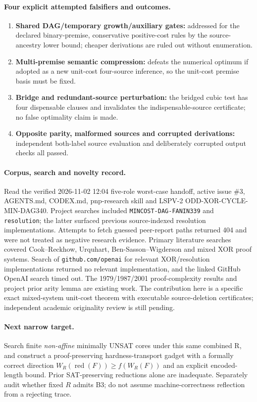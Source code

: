 \documentclass[11pt]{article}
\begin{document}
\paragraph{Four explicit attempted falsifiers and outcomes.}
\begin{enumerate}
\item[] \textbf{Shared DAG/temporary growth/auxiliary gates:} addressed for the declared binary-premise, conservative positive-cost rules by the source-ancestry lower bound; cheaper derivations are ruled out without enumeration.
\item[] \textbf{Multi-premise semantic compression:} defeats the numerical optimum if adopted as a new unit-cost four-source inference, so the unit-cost premise basis must be fixed.
\item[] \textbf{Bridge and redundant-source perturbation:} the bridged cubic test has four dispensable clauses and invalidates the indispensable-source certificate; no false optimality claim is made.
\item[] \textbf{Opposite parity, malformed sources and corrupted derivations:} independent both-label source evaluation and deliberately corrupted output checks all passed.
\end{enumerate}

\paragraph{Corpus, search and novelty record.} Read the verified 2026-11-02 12:04 five-role worst-case handoff, active issue \#3, AGENTS.md, CODEX.md, pnp-research skill and LSPV-2 ODD-XOR-CYCLE-MIN-DAG340. Project searches included \texttt{MINCOST-DAG-FANIN339} and \texttt{resolution}; the latter surfaced previous source-indexed resolution implementations. Attempts to fetch guessed peer-report paths returned 404 and were not treated as negative research evidence. Primary literature searches covered Cook--Reckhow, Urquhart, Ben-Sasson--Wigderson and mixed XOR proof systems. Search of \texttt{github.com/openai} for relevant XOR/resolution implementations returned no relevant implementation, and the linked GitHub OpenAI search timed out. The 1979/1987/2001 proof-complexity results and project prior arity lemma are existing work. The contribution here is a specific exact mixed-system unit-cost theorem with executable source-deletion certificates; independent academic originality review is still pending.

\paragraph{Next narrow target.}
Search finite \emph{non-affine} minimally UNSAT cores under this same combined R, and construct a proof-preserving hardness-transport gadget with a formally correct direction $W_R(\operatorname{red}(F))\ge f(W_R(F))$ and an explicit encoded-length bound. Prior SAT-preserving reductions alone are inadequate. Separately audit whether fixed $R$ admits B3; do not assume machine-correctness reflection from a rejecting trace.



\end{document}
